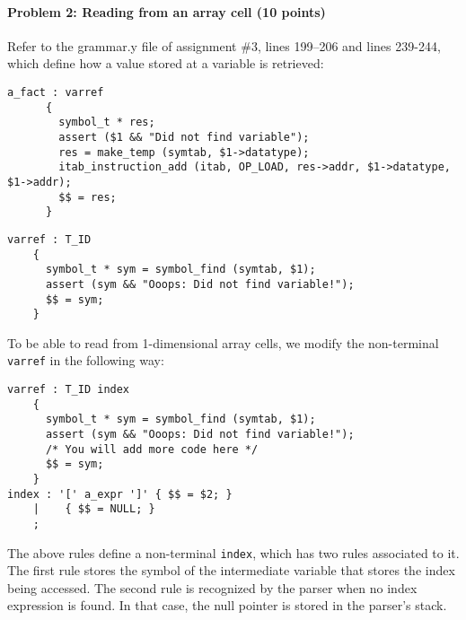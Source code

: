 


\paragraph{Problem 2: Reading from an array cell (10 points)}


Refer to the grammar.y file of assignment \#3, lines 199--206 and lines 239-244,
which define how a value stored at a variable is retrieved:

\vspace{2em}

\begin{lstlisting}
a_fact : varref 
      {
        symbol_t * res;
        assert ($1 && "Did not find variable");
        res = make_temp (symtab, $1->datatype);
        itab_instruction_add (itab, OP_LOAD, res->addr, $1->datatype, $1->addr);
        $$ = res;
      }
\end{lstlisting}

\vspace{2em}


\begin{lstlisting}
varref : T_ID 
    {
      symbol_t * sym = symbol_find (symtab, $1);
      assert (sym && "Ooops: Did not find variable!");
      $$ = sym;
    }
\end{lstlisting}

\vspace{2em}


To be able to read from 1-dimensional array cells, we modify the non-terminal \texttt{varref}
in the following way:

\vspace{2em}


\begin{lstlisting}
varref : T_ID index
    {
      symbol_t * sym = symbol_find (symtab, $1);
      assert (sym && "Ooops: Did not find variable!");
      /* You will add more code here */
      $$ = sym;
    }
index : '[' a_expr ']' { $$ = $2; }
    |    { $$ = NULL; }
    ;
\end{lstlisting}

\vspace{2em}

The above rules define a non-terminal \texttt{index}, which has two
rules associated to it. The first rule stores the symbol of the intermediate
variable that stores the index being accessed. The second rule is recognized
by the parser when no index expression is found. In that case, the null pointer
is stored in the parser's stack.

